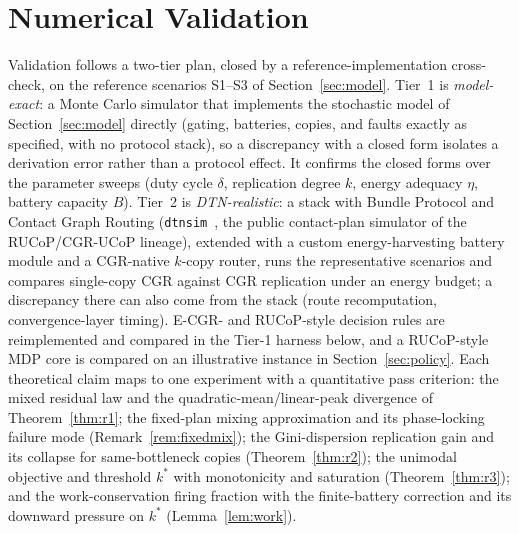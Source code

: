 \documentclass[twocolumn,3p,times,procedia]{elsarticle}
\theoremstyle{plain}
\theoremstyle{remark}
\newcommand{\kstar}{k^{\ast}}
\begin{document}
\section{Numerical Validation}\label{sec:sim}
Validation follows a two-tier plan, closed by a reference-implementation
cross-check, on the reference scenarios S1--S3 of
Section~\ref{sec:model}. Tier~1 is \emph{model-exact}: a Monte Carlo
simulator that implements the stochastic model of
Section~\ref{sec:model} directly (gating, batteries, copies, and
faults exactly as specified, with no protocol stack), so a discrepancy
with a closed form isolates a derivation error rather than a protocol
effect. It confirms the closed forms over the parameter sweeps (duty
cycle $\delta$, replication degree $k$, energy adequacy $\eta$, battery
capacity $B$). Tier~2 is \emph{DTN-realistic}: a stack with Bundle
Protocol and Contact Graph Routing (\texttt{dtnsim}~\cite{fraire2017dtnsim},
the public contact-plan simulator of the RUCoP/CGR-UCoP lineage), extended with a custom
energy-harvesting battery module and a CGR-native $k$-copy router, runs
the representative scenarios and compares single-copy CGR against CGR
replication under an energy budget; a discrepancy there can also come
from the stack (route recomputation, convergence-layer timing). E-CGR-
and RUCoP-style decision rules are reimplemented and compared in the
Tier-1 harness below, and a RUCoP-style MDP core is compared on an
illustrative instance in Section~\ref{sec:policy}. Each theoretical
claim maps to one experiment with a quantitative pass criterion: the
mixed residual law and the quadratic-mean/linear-peak divergence of
Theorem~\ref{thm:r1}; the fixed-plan mixing approximation and its
phase-locking failure mode (Remark~\ref{rem:fixedmix}); the
Gini-dispersion replication gain and its collapse for same-bottleneck
copies (Theorem~\ref{thm:r2}); the unimodal objective and threshold
$\kstar$ with monotonicity and saturation (Theorem~\ref{thm:r3}); and
the work-conservation firing fraction with the finite-battery correction
and its downward pressure on $\kstar$ (Lemma~\ref{lem:work}).
\end{document}
